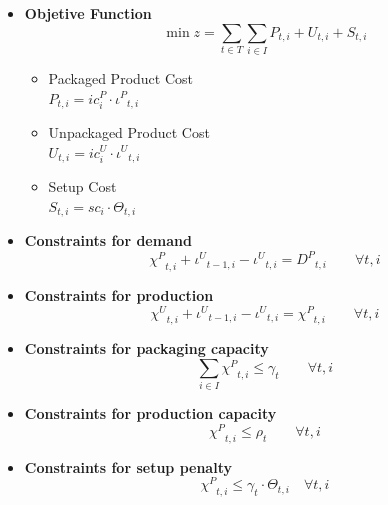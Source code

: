 \documentclass[a4paper,12pt]{article}
\begin{document}
\begin{itemize}
    \item \textbf{Objetive Function}
        \begin{equation}
            \min z = \sum_{t \in T}\sum_{i \in I}
                P_{t, i}
            +   U_{t, i} 
            +   S_{t, i}
        \end{equation}
    
        \begin{itemize}
            \item Packaged Product Cost \\ 
                $P_{t, i} = ic^P_i \cdot {\iota ^P}_{t, i}$
            \item Unpackaged Product Cost  \\
                $U_{t, i} = ic^U_i \cdot {\iota ^U}_{t, i}$
             \item Setup Cost  \\
                $S_{t, i} = sc_i \cdot \Theta_{t, i}$    
        \end{itemize}
    \item \textbf{Constraints for demand}
        \begin{equation}
             {\chi^P}_{t, i} 
                + {\iota^U}_{t-1, i} 
                - {\iota^U}_{t, i} 
                =
                {D^P}_{t, i} \qquad \forall{t, i}
        \end{equation}      
    \item \textbf{Constraints for production}
        \begin{equation}
             {\chi^U}_{t, i} 
                + {\iota^U}_{t-1, i} 
                - {\iota^U}_{t, i} 
                =
                {\chi^P}_{t, i} \qquad \forall{t, i}
        \end{equation}    
    \item \textbf{Constraints for packaging capacity}
        \begin{equation}
             \sum_{i \in I} {\chi^P}_{t, i} \leq \gamma_t  \qquad \forall{t, i}
        \end{equation}
    \item \textbf{Constraints for production capacity}
        \begin{equation}
             {\chi^P}_{t, i} \leq \rho_t  \qquad \forall{t, i}
        \end{equation}
    \item \textbf{Constraints for setup penalty}
        \begin{equation}
             {\chi^P}_{t, i} \leq \gamma_t  \cdot \Theta_{t, i}
             \quad  \forall{t, i}
        \end{equation}    
\end{itemize}
\end{document}
